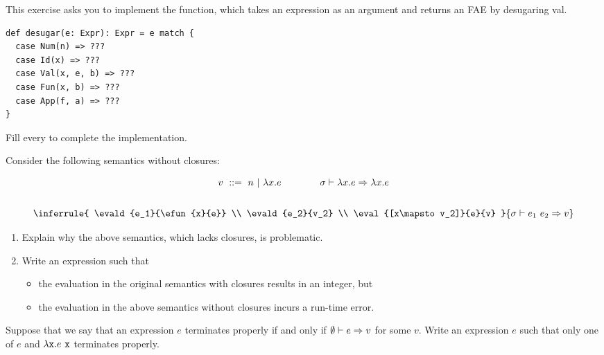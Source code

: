 \begin{exercise}

This exercise asks you to implement the  function, which
  takes an \lang expression as an argument and returns an \textsf{FAE} by
  desugaring \textsf{val}.

\begin{verbatim}
def desugar(e: Expr): Expr = e match {
  case Num(n) => ???
  case Id(x) => ???
  case Val(x, e, b) => ???
  case Fun(x, b) => ???
  case App(f, a) => ???
}
\end{verbatim}

Fill every  to complete the implementation.

\end{exercise}

\begin{exercise}

Consider the following semantics without closures:

\[
\begin{array}{c}
  v\ ::=\ n\ |\ \efun{x}{e} \qquad\qquad
  \evald{\efun{x}{e}}{\efun{x}{e}}
  \\[2em]
  \inferrule
  { \evald{e_1}{\efun{x}{e}} \\
    \evald{e_2}{v_2} \\
    \eval{[x\mapsto v_2]}{e}{v} }
  { \evald{\eapp{e_1}{e_2}}{v} }
\end{array}
\]

\begin{enumerate}
  \item
    Explain why the above semantics, which lacks closures, is problematic.
  \item
    Write an \lang expression such that
    \begin{itemize}
        \item the evaluation in the original semantics with closures results
          in an integer, but
        \item the evaluation in the above semantics without closures incurs
          a run-time error.
    \end{itemize}
\end{enumerate}

\end{exercise}

\begin{exercise}

Suppose that we say that an expression $e$ terminates properly if and only
if $\emptyset\vdash e\Rightarrow v$ for some $v$. Write an \lang expression $e$ such
that only one of $e$ and $\lambda\texttt{x}.e\ \texttt{x}$ terminates properly.

\end{exercise}

